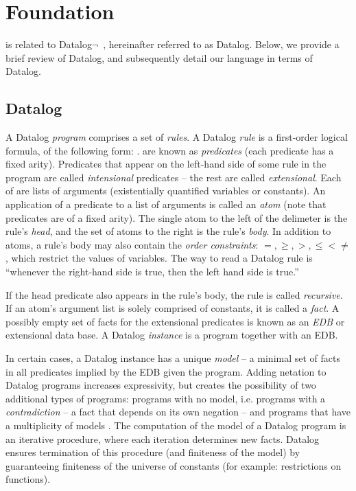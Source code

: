 \section{Foundation}
\label{sec:lang}

\lang is related to Datalog$\lnot$~\cite{ullmanbook}, hereinafter referred to as Datalog.  Below, we provide a brief review of Datalog, and subsequently detail our language in terms of Datalog.

\subsection{Datalog}
\label{sec:datalog}

A Datalog {\em program} comprises a set of {\em rules}.  A Datalog {\em rule} is a first-order logical formula, of the following form: .   are known as {\em predicates} (each predicate has a fixed arity).  Predicates that appear on the left-hand side of some rule in the program are called {\em intensional} predicates -- the rest are called {\em extensional}.  Each of  are lists of arguments (existentially quantified variables or constants).  An application of a predicate to a list of arguments is called an {\em atom} (note that predicates are of a fixed arity).  The single atom to the left of the \dedalus{:-} delimeter is the rule's {\em head}, and the set of atoms to the right is the rule's {\em body}.  In addition to atoms, a rule's body may also contain the {\em order constraints}: $=, \geq, >, \leq < \neq$, which restrict the values of variables.  The way to read a Datalog rule is ``whenever the right-hand side is true, then the left hand side is true.''

If the head predicate also appears in the rule's body, the rule is called {\em recursive}.  If an atom's argument list is solely comprised of constants, it is called a {\em fact}.  A possibly empty set of facts for the extensional predicates is known as an {\em EDB} or extensional data base.  A Datalog {\em instance} is a program together with an EDB.

In certain cases, a Datalog instance has a unique {\em model}  -- a minimal set of facts in all predicates implied by the EDB given the program.  Adding netation to Datalog programs increases expressivity, but creates the possibility of two additional types of programs: programs with no model, i.e. programs with a {\em contradiction} -- a fact that depends on its own negation -- and programs that have a multiplicity of models .  The computation of the model of a Datalog program is an iterative procedure, where each iteration determines new facts.  Datalog ensures termination of this procedure (and finiteness of the model) by guaranteeing finiteness of the universe of constants (for example: restrictions on functions).

